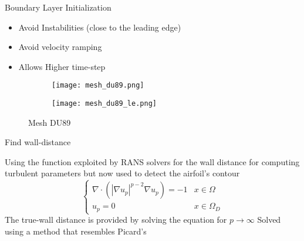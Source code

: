 \begin{frame}{Boundary Layer Initialization}
    \begin{itemize}
    \item Avoid Instabilities (close to the leading edge)
    \item Avoid velocity ramping
    \item Allows Higher time-step
    \end{itemize}


    \begin{figure}[h]
        \centering          
        \begin{subfigure}[h]{0.45\textwidth}
                 \centering
            \texttt{[image: mesh\_du89.png]}
       \end{subfigure}
             \hfill
        \begin{subfigure}[h]{0.45\textwidth}
         \centering
            \texttt{[image: mesh\_du89\_le.png]}
        \end{subfigure}
        \caption{Mesh DU89}
        \end{figure} 
\end{frame}



\begin{frame}{Find wall-distance}

    Using the function exploited by RANS solvers for the wall distance for computing turbulent parameters but now used to detect the airfoil's contour
    \begin{equation}
    \begin{cases}
        \nabla \cdot (|\nabla u_p|^{p-2} \nabla u_p) = -1 & x\in \Omega\\
        u_p = 0 & x\in \Omega_D
        \end{cases}
        \label{equ:ppoisson}
    \end{equation}
    The true-wall distance is provided by solving the equation for $p\xrightarrow{}\infty$
    Solved using a method that resembles Picard's
    \end{frame}
    
